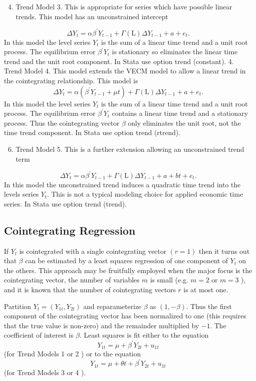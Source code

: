 \documentclass[10pt]{article}
\begin{document}
\begin{enumerate}
  \setcounter{enumi}{3}
  \item Trend Model 3. This is appropriate for series which have possible linear trends. This model has an unconstrained intercept
\end{enumerate}
$$
\Delta Y_{t}=\alpha \beta^{\prime} Y_{t-1}+\Gamma(\mathrm{L}) \Delta Y_{t-1}+a+e_{t} .
$$
In this model the level series $Y_{t}$ is the sum of a linear time trend and a unit root process. The equilibrium error $\beta^{\prime} Y_{t}$ is stationary so eliminates the linear time trend and the unit root component. In Stata use option trend (constant). 4. Trend Model 4. This model extends the VECM model to allow a linear trend in the cointegrating relationship. This model is
$$
\Delta Y_{t}=\alpha\left(\beta^{\prime} Y_{t-1}+\mu t\right)+\Gamma(\mathrm{L}) \Delta Y_{t-1}+a+e_{t} .
$$
In this model the level series $Y_{t}$ is the sum of a linear time trend and a unit root process. The equilibrium error $\beta^{\prime} Y_{t}$ contains a linear time trend and a stationary process. Thus the cointegrating vector $\beta$ only eliminates the unit root, not the time trend component. In Stata use option trend (rtrend).

\begin{enumerate}
  \setcounter{enumi}{5}
  \item Trend Model 5. This is a further extension allowing an unconstrained trend term
\end{enumerate}
$$
\Delta Y_{t}=\alpha \beta^{\prime} Y_{t-1}+\Gamma(\mathrm{L}) \Delta Y_{t-1}+a+b t+e_{t} .
$$
In this model the unconstrained trend induces a quadratic time trend into the levels series $Y_{t}$. This is not a typical modeling choice for applied economic time series. In Stata use option trend (trend).

\subsection{Cointegrating Regression}
If $Y_{t}$ is cointegrated with a single cointegrating vector $(r=1)$ then it turns out that $\beta$ can be estimated by a least squares regression of one component of $Y_{t}$ on the others. This approach may be fruitfully employed when the major focus is the cointegrating vector, the number of variables $m$ is small (e.g. $m=2$ or $m=3$ ), and it is known that the number of cointegrating vectors $r$ is at most one.

Partition $Y_{t}=\left(Y_{1 t}, Y_{2 t}\right)$ and reparameterize $\beta$ as $(1,-\beta)$. Thus the first component of the cointegrating vector has been normalized to one (this requires that the true value is non-zero) and the remainder multiplied by $-1$. The coefficient of interest is $\beta$. Least squares is fit either to the equation
$$
Y_{1 t}=\mu+\beta^{\prime} Y_{2 t}+u_{1 t}
$$
(for Trend Models 1 or 2 ) or to the equation
$$
Y_{1 t}=\mu+\theta t+\beta^{\prime} Y_{2 t}+u_{1 t}
$$
(for Trend Models 3 or 4 ).
\end{document}
